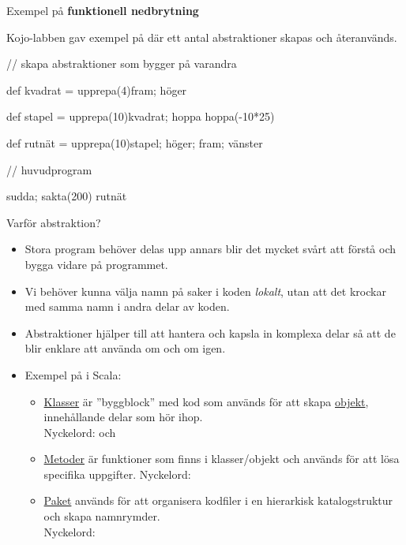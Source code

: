 \begin{Slide}{Exempel på \textbf{funktionell nedbrytning}}

Kojo-labben gav exempel på  där ett antal abstraktioner skapas och återanvänds.

\begin{Code}
// skapa abstraktioner som bygger på varandra

def kvadrat = upprepa(4){fram; höger}

def stapel = {
  upprepa(10){kvadrat; hoppa}
  hoppa(-10*25)
} 

def rutnät = upprepa(10){stapel; höger; fram; vänster}

// huvudprogram

sudda; sakta(200)
rutnät
\end{Code}
\end{Slide}


\begin{Slide}{Varför abstraktion?}
\begin{itemize}
\item Stora program behöver delas upp annars blir det mycket svårt att förstå och bygga vidare på programmet.
\item Vi behöver kunna välja namn på saker i koden \textit{lokalt}, utan att det krockar med samma namn i andra delar av koden.
\item Abstraktioner hjälper till att hantera och kapsla in komplexa delar så att de blir enklare att använda om och om igen.

\item Exempel på  i Scala:
\begin{itemize}

\item \href{https://sv.wikipedia.org/wiki/Klass_\%28programmering\%29}{Klasser} är ''byggblock'' med kod som används för att skapa \href{https://sv.wikipedia.org/wiki/Objektorienterad_programmering\#Objekt}{objekt}, innehållande delar som hör ihop. \\ Nyckelord:  och 

\item \href{https://en.wikipedia.org/wiki/Method_\%28computer_programming\%29}{Metoder} är funktioner som finns i klasser/objekt och används för att lösa specifika uppgifter.  Nyckelord: 

\item \href{https://en.wikipedia.org/wiki/Java_package}{Paket} används för att organisera kodfiler i en hierarkisk katalogstruktur och skapa namnrymder. \\Nyckelord: 

\end{itemize}

\end{itemize}
\end{Slide}


